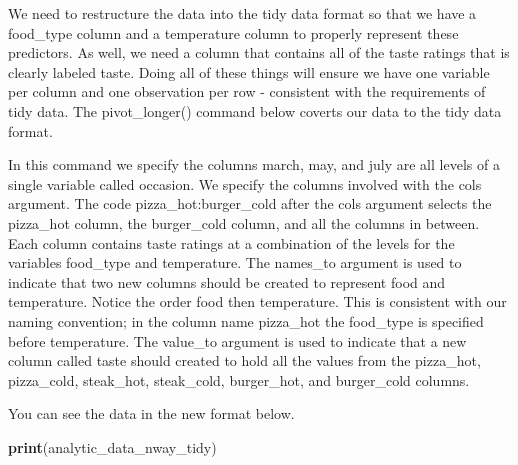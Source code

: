 \documentclass[
]{krantz}
\makeatletter
\newenvironment{Shaded}{\begin{snugshade}}{\end{snugshade}}
\newcommand{\DataTypeTok}[1]{\textcolor[rgb]{0.27,0.27,0.27}{#1}}
\newcommand{\KeywordTok}[1]{\textcolor[rgb]{0.27,0.27,0.27}{\textbf{#1}}}
\newcommand{\NormalTok}[1]{#1}
\newcommand{\OperatorTok}[1]{\textcolor[rgb]{0.43,0.43,0.43}{\textbf{#1}}}
\newcommand{\StringTok}[1]{\textcolor[rgb]{0.5,0.5,0.5}{#1}}
\newenvironment{kframe}{%
\medskip{}
\setlength{\fboxsep}{.8em}
 \def\at@end@of@kframe{}%
 \ifinner\ifhmode%
  \def\at@end@of@kframe{\end{minipage}}%
  \begin{minipage}{\columnwidth}%
 \fi\fi%
 \def\FrameCommand##1{\hskip\@totalleftmargin \hskip-\fboxsep
 \colorbox{shadecolor}{##1}\hskip-\fboxsep
     \hskip-\linewidth \hskip-\@totalleftmargin \hskip\columnwidth}%
 \MakeFramed {\advance\hsize-\width
   \@totalleftmargin\z@ \linewidth\hsize
   \@setminipage}}%
 {\par\unskip\endMakeFramed%
 \at@end@of@kframe}
\renewenvironment{Shaded}{\begin{kframe}}{\end{kframe}}
\makeatother
\begin{document}
We need to restructure the data into the tidy data format so that we have a food\_type column and a temperature column to properly represent these predictors. As well, we need a column that contains all of the taste ratings that is clearly labeled taste. Doing all of these things will ensure we have one variable per column and one observation per row - consistent with the requirements of tidy data. The pivot\_longer() command below coverts our data to the tidy data format.

In this command we specify the columns march, may, and july are all levels of a single variable called occasion. We specify the columns involved with the cols argument. The code pizza\_hot:burger\_cold after the cols argument selects the pizza\_hot column, the burger\_cold column, and all the columns in between. Each column contains taste ratings at a combination of the levels for the variables food\_type and temperature. The names\_to argument is used to indicate that two new columns should be created to represent food and temperature. Notice the order food then temperature. This is consistent with our naming convention; in the column name pizza\_hot the food\_type is specified before temperature. The value\_to argument is used to indicate that a new column called taste should created to hold all the values from the pizza\_hot, pizza\_cold, steak\_hot, steak\_cold, burger\_hot, and burger\_cold columns.

\begin{Shaded}
\end{Shaded}

You can see the data in the new format below.

\begin{Shaded}
\begin{Highlighting}[]
\KeywordTok{print}\NormalTok{(analytic_data_nway_tidy)}
\end{Highlighting}
\end{Shaded}
\end{document}
